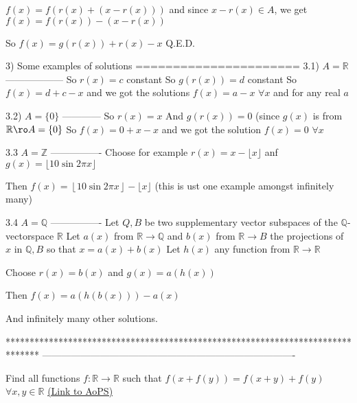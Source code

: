 \begin{solution}
$f(x)=f(r(x)+(x-r(x)))$ and since $x-r(x)\in A$, we get $f(x)=f(r(x))-(x-r(x))$

So $f(x)=g(r(x))+r(x)-x$
Q.E.D.


3) Some examples of solutions
======================
3.1) $A=\mathbb R$
------------------
So $r(x)=c$ constant
So $g(r(x))=d$ constant
So $f(x)=d+c-x$ and we got the solutions $\boxed{f(x)=a-x}$ $\forall x$ and for any real $a$

3.2) $A=\{0\}$
------------
So $r(x)=x$
And $g(r(x))=0$ (since $g(x)$ is from $\mathbb R\ro A=\{0\}$
So $f(x)=0+x-x$ and we got the solution $\boxed{f(x)=0}$ $\forall x$

3.3 $A=\mathbb Z$
----------------
Choose for example $r(x)=x-\lfloor x\rfloor$ anf $g(x)=\lfloor 10\sin 2\pi x\rfloor$

Then $\boxed{f(x)=\left\lfloor 10\sin 2\pi x\right\rfloor-\lfloor x\rfloor}$
(this is ust one example amongst infinitely many)

3.4 $A=\mathbb Q$
----------------
Let $Q,B$ be two supplementary vector subspaces of the $\mathbb Q$-vectorspace $\mathbb R$
Let $a(x)$ from $\mathbb R\to \mathbb Q$ and $b(x)$ from $\mathbb R\to B$ the projections of $x$ in $\mathbb Q,B$ so that $x=a(x)+b(x)$
Let $h(x)$ any function from $\mathbb R\to\mathbb R$

Choose $r(x)=b(x)$ and $g(x)=a(h(x))$

Then $\boxed{f(x)=a(h(b(x)))-a(x)}$


And infinitely many other solutions.
\end{solution}
*******************************************************************************
-------------------------------------------------------------------------------

\begin{problem}
	Find all functions $f: \mathbb{R} \rightarrow \mathbb{R}$ such that
                                                                                                              $f(x+f(y))=f(x+y)+f(y)$  $\forall x,y \in \mathbb{R}$
	\flushright \href{https://artofproblemsolving.com/community/c6h543699}{(Link to AoPS)}
\end{problem}



